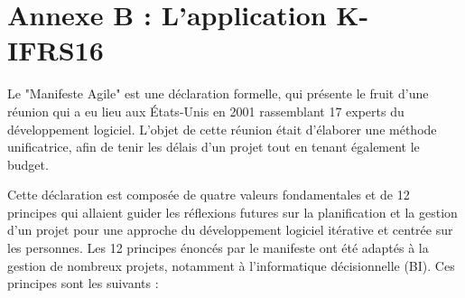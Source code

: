 \setcounter{figure}{0} 
\setcounter{table}{0}
\setcounter{footnote}{0}
\setcounter{equation}{0}
\pagestyle{fancy}
\fancyhf{}
\renewcommand{\chaptermark}[1]{\markboth{\MakeUppercase{#1 }}{}}
\renewcommand{\sectionmark}[1]{\markright{\thesection~ #1}}
\fancyhead[RO]{\bfseries\rightmark}
\fancyhead[LE]{\bfseries\leftmark}
\fancyfoot[RO]{\thepage}
\fancyfoot[LE]{\thepage}
\renewcommand{\headrulewidth}{0.5pt}
\renewcommand{\footrulewidth}{0pt}

\makeatletter
\renewcommand\thefigure{B.\arabic{figure}}
\renewcommand\thetable{B.\arabic{table}} 
\makeatother

\chapter{Annexe B : L'application K-IFRS16 }
\graphicspath{{Annexe1/figures/}}


Le "Manifeste Agile" est une déclaration formelle, qui présente le fruit d’une réunion qui a eu lieu aux États-Unis en 2001 rassemblant 17 experts du développement logiciel. L’objet de cette réunion était d’élaborer une méthode unificatrice, afin de tenir les délais d’un projet tout en tenant également le budget.

Cette déclaration est composée de quatre valeurs fondamentales et de 12 principes qui allaient guider les réflexions futures sur la planification et la gestion d’un projet pour une approche du développement logiciel itérative et centrée sur les personnes. Les 12 principes énoncés par le manifeste ont été adaptés à la gestion de nombreux projets, notamment à l'informatique décisionnelle (BI). Ces principes sont les suivants :

